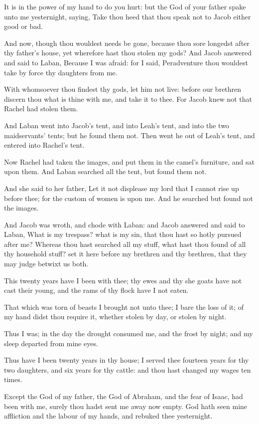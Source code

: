 \verse It is in the power of my hand to do you hurt: but the God of
your father spake unto me yesternight, saying, Take thou heed that
thou speak not to Jacob either good or bad.

\verse And now, though thou wouldest needs be gone, because thou sore
longedst after thy father's house, yet wherefore hast thou stolen my
gods?  \verse And Jacob answered and said to Laban, Because I was
afraid: for I said, Peradventure thou wouldest take by force thy
daughters from me.

\verse With whomsoever thou findest thy gods, let him not live: before
our brethren discern thou what is thine with me, and take it to thee.
For Jacob knew not that Rachel had stolen them.

\verse And Laban went into Jacob's tent, and into Leah's tent, and into
the two maidservants' tents; but he found them not. Then went he out
of Leah's tent, and entered into Rachel's tent.

\verse Now Rachel had taken the images, and put them in the camel's
furniture, and sat upon them. And Laban searched all the tent, but
found them not.

\verse And she said to her father, Let it not displease my lord that I
cannot rise up before thee; for the custom of women is upon me. And he
searched but found not the images.

\verse And Jacob was wroth, and chode with Laban: and Jacob answered
and said to Laban, What is my trespass? what is my sin, that thou hast
so hotly pursued after me?  \verse Whereas thou hast searched all my
stuff, what hast thou found of all thy household stuff? set it here
before my brethren and thy brethren, that they may judge betwixt us
both.

\verse This twenty years have I been with thee; thy ewes and thy she
goats have not cast their young, and the rams of thy flock have I not
eaten.

\verse That which was torn of beasts I brought not unto thee; I bare
the loss of it; of my hand didst thou require it, whether stolen by
day, or stolen by night.

\verse Thus I was; in the day the drought consumed me, and the frost by
night; and my sleep departed from mine eyes.

\verse Thus have I been twenty years in thy house; I served thee
fourteen years for thy two daughters, and six years for thy cattle:
and thou hast changed my wages ten times.

\verse Except the God of my father, the God of Abraham, and the fear of
Isaac, had been with me, surely thou hadst sent me away now empty. God
hath seen mine affliction and the labour of my hands, and rebuked thee
yesternight.

